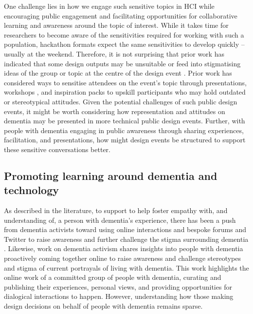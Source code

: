 One challenge lies in how we engage such sensitive topics in HCI while encouraging public engagement and facilitating opportunities for collaborative learning and awareness around the topic of interest. While it takes time for researchers to become aware of the sensitivities required for working with such a population, hackathon formats expect the same sensitivities to develop quickly – usually at the weekend. Therefore, it is not surprising that prior work has indicated that some design outputs may be unsuitable or feed into stigmatising ideas of the group or topic at the centre of the design event \citep{toros_co-creation_2020}. Prior work has considered ways to sensitise attendees on the event's topic through presentations, workshops \citep{hope_hackathons_2019}, and inspiration packs \citep{birbeck_self_2017} to upskill participants who may hold outdated or stereotypical attitudes. Given the potential challenges of such public design events, it might be worth considering how representation and attitudes on dementia may be presented in more technical public design events. Further, with people with dementia engaging in public awareness through sharing experiences, facilitation, and presentations, how might design events be structured to support these sensitive conversations better.

\subsection{Promoting learning around dementia and technology}
\label{BL:gap:Learning}
As described in the literature, to support to help foster empathy with, and understanding of, a person with dementia's experience, there has been a push from dementia activists toward using online interactions and bespoke forums and Twitter to raise awareness and further challenge the stigma surrounding dementia \citep{talbot_how_2020}. Likewise, \cite{lazar_safe_2019} work on dementia activism shares insights into people with dementia proactively coming together online to raise awareness and challenge stereotypes and stigma of current portrayals of living with dementia. This work highlights the online work of a committed group of people with dementia, curating and publishing their experiences, personal views, and providing opportunities for dialogical interactions to happen. However, understanding how those making design decisions on behalf of people with dementia remains sparse. 

